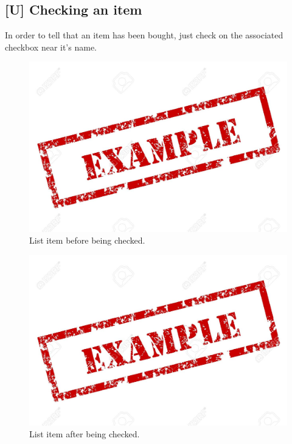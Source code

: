 \subsection{[U] Checking an item}
In order to tell that an item has been bought, just check on the associated checkbox near it's name.

\begin{figure}[H]
  \centering 
  \includegraphics[width=\textwidth]{Sections/3-HowToUse/Images/example.jpeg}
  \caption{List item before being checked.}
\end{figure}

\begin{figure}[H]
  \centering 
  \includegraphics[width=\textwidth]{Sections/3-HowToUse/Images/example.jpeg}
  \caption{List item after being checked.}
\end{figure}
